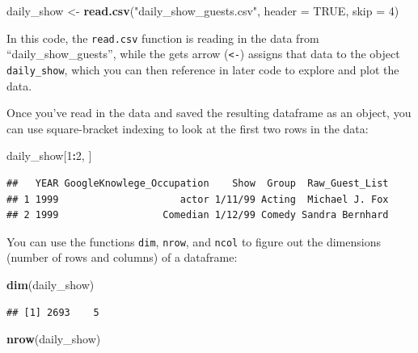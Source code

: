 \documentclass[]{book}
\makeatletter
\newenvironment{Shaded}{\begin{snugshade}}{\end{snugshade}}
\newcommand{\KeywordTok}[1]{\textcolor[rgb]{0.13,0.29,0.53}{\textbf{#1}}}
\newcommand{\DataTypeTok}[1]{\textcolor[rgb]{0.13,0.29,0.53}{#1}}
\newcommand{\DecValTok}[1]{\textcolor[rgb]{0.00,0.00,0.81}{#1}}
\newcommand{\StringTok}[1]{\textcolor[rgb]{0.31,0.60,0.02}{#1}}
\newcommand{\OtherTok}[1]{\textcolor[rgb]{0.56,0.35,0.01}{#1}}
\newcommand{\OperatorTok}[1]{\textcolor[rgb]{0.81,0.36,0.00}{\textbf{#1}}}
\newcommand{\NormalTok}[1]{#1}
\newenvironment{kframe}{%
\medskip{}
\setlength{\fboxsep}{.8em}
 \def\at@end@of@kframe{}%
 \ifinner\ifhmode%
  \def\at@end@of@kframe{\end{minipage}}%
  \begin{minipage}{\columnwidth}%
 \fi\fi%
 \def\FrameCommand##1{\hskip\@totalleftmargin \hskip-\fboxsep
 \colorbox{shadecolor}{##1}\hskip-\fboxsep
     \hskip-\linewidth \hskip-\@totalleftmargin \hskip\columnwidth}%
 \MakeFramed {\advance\hsize-\width
   \@totalleftmargin\z@ \linewidth\hsize
   \@setminipage}}%
 {\par\unskip\endMakeFramed%
 \at@end@of@kframe}
\renewenvironment{Shaded}{\begin{kframe}}{\end{kframe}}
\theoremstyle{definition}
\theoremstyle{definition}
\theoremstyle{definition}
\theoremstyle{remark}
\makeatother
\begin{document}
\begin{Shaded}
\begin{Highlighting}[]
\NormalTok{daily_show <-}\StringTok{ }\KeywordTok{read.csv}\NormalTok{(}\StringTok{"daily_show_guests.csv"}\NormalTok{,}
                       \DataTypeTok{header =} \OtherTok{TRUE}\NormalTok{,}
                       \DataTypeTok{skip =} \DecValTok{4}\NormalTok{)}
\end{Highlighting}
\end{Shaded}

In this code, the \texttt{read.csv} function is reading in the data from
``daily\_show\_guests'', while the gets arrow (\texttt{\textless{}-})
assigns that data to the object \texttt{daily\_show}, which you can then
reference in later code to explore and plot the data.

Once you've read in the data and saved the resulting dataframe as an
object, you can use square-bracket indexing to look at the first two
rows in the data:

\begin{Shaded}
\begin{Highlighting}[]
\NormalTok{daily_show[}\DecValTok{1}\OperatorTok{:}\DecValTok{2}\NormalTok{, ]}
\end{Highlighting}
\end{Shaded}

\begin{verbatim}
##   YEAR GoogleKnowlege_Occupation    Show  Group  Raw_Guest_List
## 1 1999                     actor 1/11/99 Acting  Michael J. Fox
## 2 1999                  Comedian 1/12/99 Comedy Sandra Bernhard
\end{verbatim}

You can use the functions \texttt{dim}, \texttt{nrow}, and \texttt{ncol}
to figure out the dimensions (number of rows and columns) of a
dataframe:

\begin{Shaded}
\begin{Highlighting}[]
\KeywordTok{dim}\NormalTok{(daily_show)}
\end{Highlighting}
\end{Shaded}

\begin{verbatim}
## [1] 2693    5
\end{verbatim}

\begin{Shaded}
\begin{Highlighting}[]
\KeywordTok{nrow}\NormalTok{(daily_show)}
\end{Highlighting}
\end{Shaded}
\end{document}
